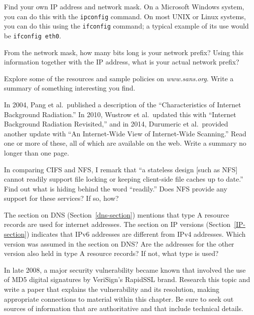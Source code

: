 \begin{chapterEnumerate}
\item
Find your own IP
address and network mask.  
On a Microsoft Windows system, you can do this with the
\verb|ipconfig| command.  On most UNIX or Linux systems, you can do
this using the \verb|ifconfig| command; a typical example of its use
would be \verb|ifconfig eth0|.

From the network mask, how many bits long
is your network prefix?  Using this information together with the IP
address, what is your actual network prefix?

\item
Explore some of the resources and sample policies on
\textit{www.sans.org}.  Write a summary of something interesting you
find.

\item
In 2004, Pang et al.\ published a description of the ``Characteristics of
Internet Background Radiation.'' In 2010, Wustrow et al.\ updated this with ``Internet Background Radiation Revisited,'' and in 2014, Durumeric et al.\ provided another update with ``An Internet-Wide View of Internet-Wide Scanning.''
Read one or more of these, all of which are available on the web.  Write
a summary no longer than one page.
\item
In comparing CIFS and NFS, I remark that ``a stateless design [such as NFS] cannot readily support file locking or keeping client-side file caches up to date.''  Find out what is hiding behind the word ``readily.''  Does NFS provide any support for these services?  If so, how?

\item
The section on DNS (Section~\ref{dns-section}) mentions that type A resource records are used for internet addresses.  The section on IP versions (Section~\ref{IP-section}) indicates that IPv6 addresses are different from IPv4 addresses.  Which version was assumed in the section on DNS?  Are the addresses for the other version also held in type A resource records?  If not, what type is used?

\item
In late 2008, a major security vulnerability became known that involved the use of MD5 digital signatures by VeriSign's RapidSSL brand. Research this topic and write a paper that explains the vulnerability and its resolution, making appropriate connections to material within this chapter.  Be sure to seek out sources of information that are authoritative and that include technical details.
\end{chapterEnumerate}

